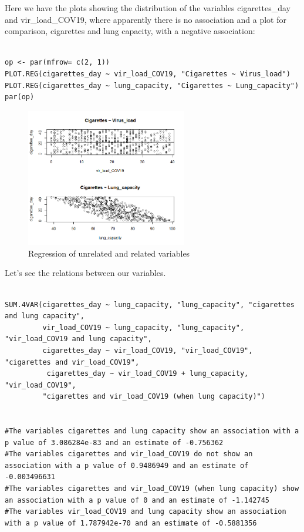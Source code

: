 \documentclass{article}
\begin{document}
Here we have the plots showing the distribution of the variables cigarettes\_day and vir\_load\_COV19, where apparently there is no association and a plot for comparison, cigarettes and lung capacity, with a negative association:\par

\begin{lstlisting}

op <- par(mfrow= c(2, 1))
PLOT.REG(cigarettes_day ~ vir_load_COV19, "Cigarettes ~ Virus_load")
PLOT.REG(cigarettes_day ~ lung_capacity, "Cigarettes ~ Lung_capacity")
par(op)

\end{lstlisting}

\begin{figure}[h]
\caption{Regression of unrelated and related variables}
\includegraphics[width=7cm]{PLOT_cig_vir_lung.png}
\centering
\end{figure}

Let's see the relations between our variables.\par

\begin{lstlisting}

SUM.4VAR(cigarettes_day ~ lung_capacity, "lung_capacity", "cigarettes and lung capacity",
         vir_load_COV19 ~ lung_capacity, "lung_capacity", "vir_load_COV19 and lung capacity",
         cigarettes_day ~ vir_load_COV19, "vir_load_COV19", "cigarettes and vir_load_COV19",
          cigarettes_day ~ vir_load_COV19 + lung_capacity, "vir_load_COV19",
         "cigarettes and vir_load_COV19 (when lung capacity)")


#The variables cigarettes and lung capacity show an association with a p value of 3.086284e-83 and an estimate of -0.756362 
#The variables cigarettes and vir_load_COV19 do not show an association with a p value of 0.9486949 and an estimate of -0.003496631 
#The variables cigarettes and vir_load_COV19 (when lung capacity) show an association with a p value of 0 and an estimate of -1.142745 
#The variables vir_load_COV19 and lung capacity show an association with a p value of 1.787942e-70 and an estimate of -0.5881356 

\end{lstlisting}
\end{document}
